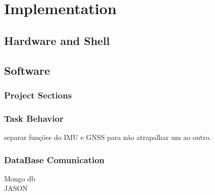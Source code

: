\chapter{Implementation}
\section{Hardware and Shell}

\section{Software}

\subsection{Project Sections}

\subsection{Task Behavior}

separar funções do IMU e GNSS para não atrapalhar um ao outro.\\
\subsection{DataBase Comunication}
Mongo db \\
JASON